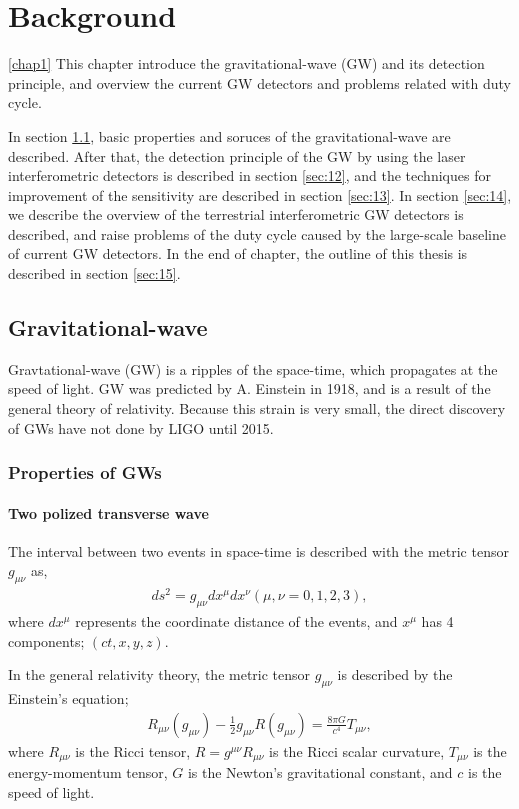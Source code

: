 \chapter{Background} \cref{chap1}
This chapter introduce the gravitational-wave (GW) and its detection principle, and overview the current GW detectors and problems related with duty cycle.

In section \cref{sec:11}, basic properties and soruces of the gravitational-wave are described. After that, the detection principle of the GW by using the laser interferometric detectors is described in section \cref{sec:12}, and the techniques for improvement of the sensitivity are described in section \cref{sec:13}. In section \cref{sec:14}, we describe the overview of the terrestrial interferometric GW detectors is described, and raise problems of the duty cycle caused by the large-scale baseline of current GW detectors. In the end of chapter, the outline of this thesis is described in section \cref{sec:15}.


\section{Gravitational-wave} \label{sec:11}
Gravtational-wave (GW) is a ripples of the space-time, which propagates at the speed of light. GW was predicted by A. Einstein in 1918, and is a result of the general theory of relativity. Because this strain is very small, the direct discovery of GWs have not done by LIGO until 2015.

\subsection{Properties of GWs} 
\subsubsection{Two polized transverse wave}
The interval between two events in space-time is
described with the metric tensor $g_{\mu\nu}$ as, 
\begin{eqnarray}
  d s^{2}=g_{\mu \nu} d x^{\mu} d x^{\nu} (\mu,\nu = 0,1,2,3),
\end{eqnarray}
where $dx^{\mu}$ represents the coordinate distance of the events, and $x^{\mu}$ has 4 components; $(ct,x,y,z)$.

In the general relativity theory\cite{einstein1916vd}, the metric tensor $g_{\mu\nu}$ is described by the Einstein's equation;
\begin{eqnarray}
  R_{\mu \nu}\left(g_{\mu \nu}\right)-\frac{1}{2} g_{\mu \nu} R\left(g_{\mu \nu}\right)=\frac{8 \pi G}{c^{4}} T_{\mu \nu},
\end{eqnarray}
where $R_{\mu\nu}$ is the Ricci tensor, $R=g^{\mu \nu} R_{\mu \nu}$ is the Ricci scalar curvature, $T_{\mu\nu}$ is the energy-momentum tensor, $G$ is the Newton's gravitational constant, and $c$ is the speed of light.

